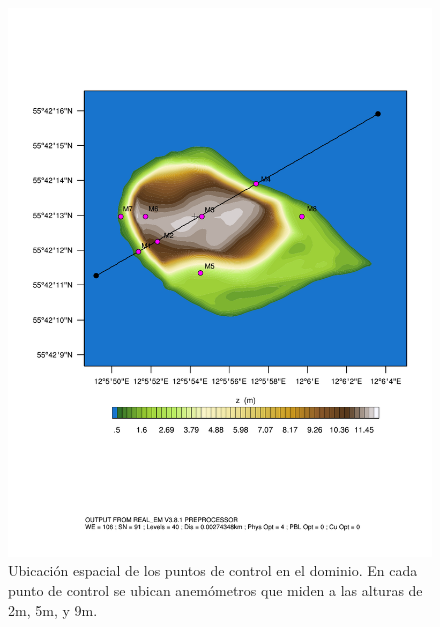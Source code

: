 \begin{figure}[H]
	\centering
	\includegraphics[width=0.9\linewidth,page=1,trim={0cm 6cm -1cm 4cm},clip]{Imagenes/05/bol_control_point.pdf}%
	\caption{Ubicación espacial de los puntos de control en el dominio. En cada punto de control se ubican anemómetros que miden a las alturas de 2m, 5m, y 9m.}
	\label{fig:05_d08_bol}
\end{figure}

